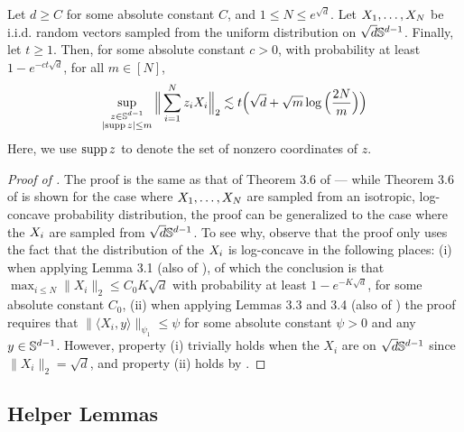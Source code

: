 \begin{lemma} \label{lemma:sparse_operator_norm_adamczak}
Let $d \geq C$ for some absolute constant $C$, and $1 \leq N \leq e^{\sqrt{d}}$. Let $X_1, \ldots, X_N$ be i.i.d. random vectors sampled from the uniform distribution on $\sqrt{d} \mathbb{S}^{d - 1}$. Finally, let $t \geq 1$. Then, for some absolute constant $c > 0$, with probability at least $1 - e^{-ct \sqrt{d}}$, for all $m \in [N]$,
\begin{align}
\sup_{\substack{z \in \mathbb{S}^{d - 1} \\ |\textup{supp} \, z| \leq m}} \Big\| \sum_{i = 1}^N z_i X_i \Big\|_2 \lesssim t \Big(\sqrt{d} + \sqrt{m} \log \Big(\frac{2N}{m}\Big)\Big)
\end{align}
Here, we use $\textup{supp} \, z$ to denote the set of nonzero coordinates of $z$.
\end{lemma}
\begin{proof}[Proof of ]
The proof is the same as that of Theorem 3.6 of \citet{ALPT2009_concentration} --- while Theorem 3.6 of \citet{ALPT2009_concentration} is shown for the case where $X_1, \ldots, X_N$ are sampled from an isotropic, log-concave probability distribution, the proof can be generalized to the case where the $X_i$ are sampled from $\sqrt{d} \mathbb{S}^{d - 1}$. To see why, observe that the proof only uses the fact that the distribution of the $X_i$ is log-concave in the following places: (i) when applying Lemma 3.1 (also of \citet{ALPT2009_concentration}), of which the conclusion is that $\max_{i \leq N} \|X_i\|_2 \leq C_0 K \sqrt{d}$ with probability at least $1 - e^{-K \sqrt{d}}$, for some absolute constant $C_0$, (ii) when applying Lemmas 3.3 and 3.4 (also of \citet{ALPT2009_concentration}) the proof requires that $\| \langle X_i, y \rangle\|_{\psi_1} \leq \psi$ for some absolute constant $\psi > 0$ and any $y \in \mathbb{S}^{d - 1}$. However, property (i) trivially holds when the $X_i$ are on $\sqrt{d} \mathbb{S}^{d - 1}$ since $\|X_i\|_2 = \sqrt{d}$, and property (ii) holds by .
\end{proof}


\subsection{Helper Lemmas}

